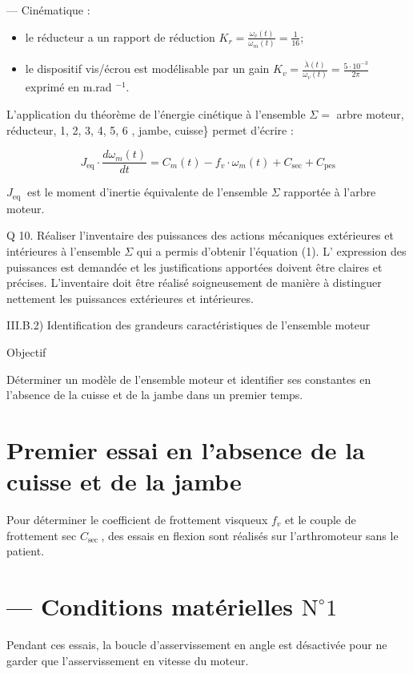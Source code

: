 — Cinématique :

\begin{itemize}
  \item le réducteur a un rapport de réduction $K_{r}=\frac{\omega_{v}(t)}{\omega_{m}(t)}=\frac{1}{16}$;
  \item le dispositif vis/écrou est modélisable par un gain $K_{v}=\frac{\dot{\lambda}(t)}{\omega_{v}(t)}=\frac{5 \cdot 10^{-3}}{2 \pi}$ exprimé en m.rad ${ }^{-1}$.
\end{itemize}

L'application du théorème de l'énergie cinétique à l'ensemble $\Sigma=$ arbre moteur, réducteur, 1, 2, 3, 4, 5, 6 , jambe, cuisse\} permet d'écrire :


\begin{equation*}
J_{\mathrm{eq}} \cdot \frac{d \omega_{m}(t)}{d t}=C_{m}(t)-f_{v} \cdot \omega_{m}(t)+C_{\mathrm{sec}}+C_{\mathrm{pes}} \tag{III.1}
\end{equation*}


$J_{\text {eq }}$ est le moment d'inertie équivalente de l'ensemble $\Sigma$ rapportée à l'arbre moteur.

Q 10. Réaliser l'inventaire des puissances des actions mécaniques extérieures et intérieures à l'ensemble $\Sigma$ qui a permis d'obtenir l'équation (1). L' expression des puissances est demandée et les justifications apportées doivent être claires et précises. L'inventaire doit être réalisé soigneusement de manière à distinguer nettement les puissances extérieures et intérieures.

III.B.2) Identification des grandeurs caractéristiques de l'ensemble moteur

Objectif

Déterminer un modèle de l'ensemble moteur et identifier ses constantes en l'absence de la cuisse et de la jambe dans un premier temps.

\section*{Premier essai en l'absence de la cuisse et de la jambe}
Pour déterminer le coefficient de frottement visqueux $f_{v}$ et le couple de frottement sec $C_{\text {sec }}$, des essais en flexion sont réalisés sur l'arthromoteur sans le patient.

\section*{— Conditions matérielles $\mathrm{N}^{\circ} 1$}
Pendant ces essais, la boucle d'asservissement en angle est désactivée pour ne garder que l'asservissement en vitesse du moteur.

